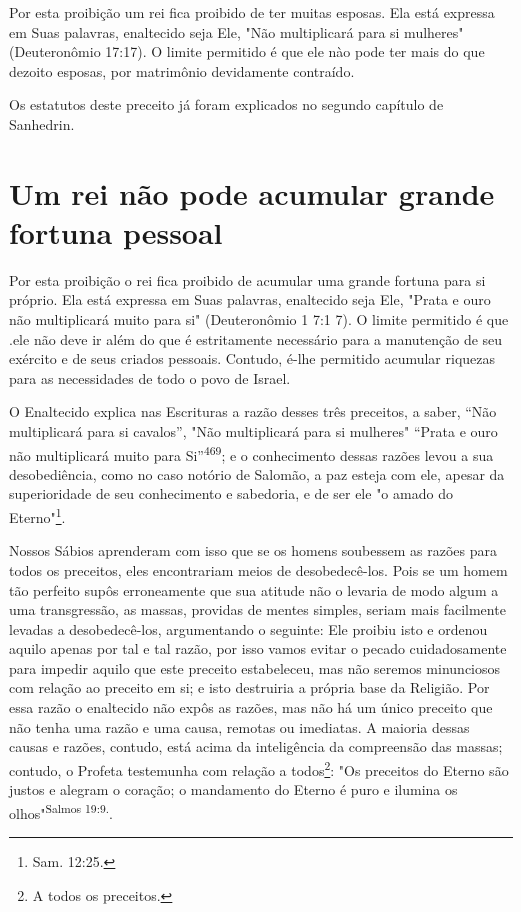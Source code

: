 Por esta proibição um rei fica proibido de ter muitas esposas. Ela es­tá
expressa em Suas palavras, enaltecido seja Ele, "Não multiplicará para
si mu­lheres" (Deuteronômio 17:17). O limite permitido é que ele nào
pode ter mais do que dezoito esposas, por matrimônio devidamente
contraído.

Os estatutos deste preceito já foram explicados no segundo capítulo de
Sanhedrin.

\section{Um rei não pode acumular grande fortuna pessoal}

Por esta proibição o rei fica proibido de acumular uma grande fortu­na
para si próprio. Ela está expressa em Suas palavras, enaltecido seja
Ele, "Pra­ta e ouro não multiplicará muito para si" (Deuteronômio 1 7:1
7). O limite per­mitido é que .ele não deve ir além do
que é estritamente necessário para a ma­nutenção de seu exército e de
seus criados pessoais. Contudo, é-lhe permitido acumular riquezas para
as necessidades de todo o povo de Israel.

O Enaltecido explica nas Escrituras a razão desses três preceitos, a
saber, ``Não multiplicará para si cavalos'', "Não multiplicará para si
mulheres"
 ``Prata e ouro não multiplicará muito para Si''\textsuperscript{469}; e
 o conhecimento dessas razões levou a sua desobediência, como no caso
 notório de Salomão, a paz es­teja com ele, apesar da superioridade de
 seu conhecimento e sabedoria, e de ser ele "o amado do
 Eterno"\footnote{Sam. 12:25.}.


Nossos Sábios aprenderam com isso que se os homens soubessem as razões
para todos os preceitos, eles encontrariam meios de desobedecê-los. Pois
se um homem tão perfeito supôs erroneamente que sua atitude não o
leva­ria de modo algum a uma transgressão, as massas, providas de mentes
simples, seriam mais facilmente levadas a desobedecê-los, argumentando o
seguinte: Ele proibiu isto e ordenou aquilo apenas por tal e tal razão,
por isso vamos evitar o pecado cuidadosamente para impedir aquilo que
este preceito estabeleceu, mas não seremos minunciosos com relação ao
preceito em si; e isto destruiria a própria base da Religião. Por essa
razão o enaltecido não expôs as razões, mas não há um único preceito que
não tenha uma razão e uma causa, remotas ou imediatas. A maioria dessas
causas e razões, contudo, está acima da inteligência
 da compreensão das massas; contudo, o Profeta testemunha com relação a
 todos\footnote{A todos os preceitos.}: "Os preceitos do Eterno são justos e
 alegram o coração; o manda­mento do Eterno é puro e ilumina os
 olhos"\textsuperscript{Salmos 19:9.}.

